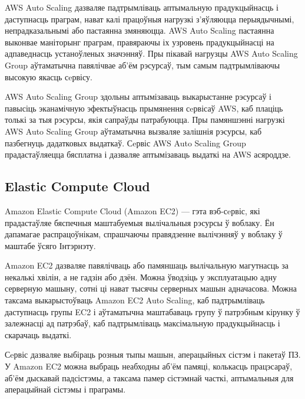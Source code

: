 AWS Auto Scaling дазваляе падтрымліваць аптымальную прадукцыйнасць і даступнасць праграм, нават калі працоўныя нагрузкі з'яўляюцца перыядычнымі, непрадказальнымі або пастаянна змяняюцца. AWS Auto Scaling пастаянна выконвае маніторынг праграм, правяраючы іх узровень прадукцыйнасці на адпаведнасць устаноўленых значэнняў. Пры пікавай нагрузцы AWS Auto Scaling Group аўтаматычна павялічвае аб'ём рэсурсаў, тым самым падтрымліваючы высокую якасць сeрвісу.

AWS Auto Scaling Group здольны аптымізаваць выкарыстанне рэсурсаў і павысіць эканамічную эфектыўнасць прымянення сeрвісаў AWS, каб плаціць толькі за тыя рэсурсы, якія сапраўды патрабуюцца. Пры памяншэнні нагрузкі AWS Auto Scaling Group аўтаматычна вызваляе залішнія рэсурсы, каб пазбегнуць дадатковых выдаткаў. Сeрвіс AWS Auto Scaling Group прадастаўляецца бясплатна і дазваляе аптымізаваць выдаткі на AWS асяроддзе.

\subsection{Elastic Compute Cloud}

Amazon Elastic Compute Cloud (Amazon EC2) --- гэта вэб-сeрвіс, які прадастаўляе бяспечныя маштабуемыя вылічальныя рэсурсы ў воблаку. Ён дапамагае распрацоўнікам, спрашчаючы правядзенне вылічэнняў у воблаку ў маштабе ўсяго Інтэрнэту.

Amazon EC2 дазваляе павялічваць або памяншаць вылічальную магутнасць за некалькі хвілін, а не гадзін або дзён. Можна ўводзіць у эксплуатацыю адну серверную машыну, сотні ці нават тысячы серверных машын адначасова. Можна таксама выкарыстоўваць Amazon EC2 Auto Scaling, каб падтрымліваць даступнасць групы EC2 і аўтаматычна маштабаваць групу ў патрэбным кірунку ў залежнасці ад патрэбаў, каб падтрымліваць максімальную прадукцыйнасць і скарачаць выдаткі.

Сeрвіс дазваляе выбіраць розныя тыпы машын, аперацыйных сістэм і пакетаў ПЗ. У Amazon EC2 можна выбраць неабходны аб'ём памяці, колькасць працэсараў, аб'ём дыскавай падсістэмы, а таксама памер сістэмнай часткі, аптымальныя для аперацыйнай сістэмы і праграмы.
